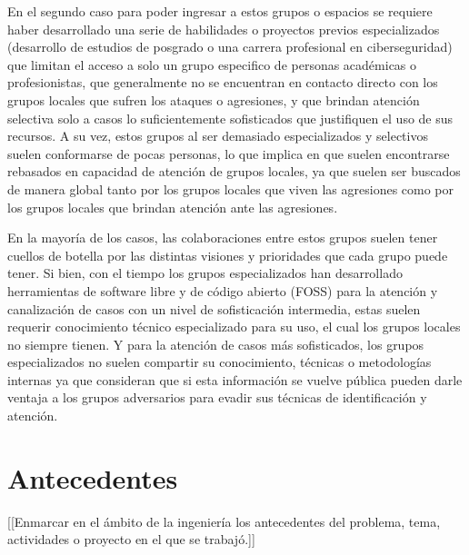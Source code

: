 \documentclass[12pt]{caltech_thesis}
\begin{document}
En el segundo caso para poder ingresar a estos grupos o espacios se requiere haber desarrollado una serie de habilidades o proyectos previos especializados (desarrollo de estudios de posgrado o una carrera profesional en ciberseguridad) que limitan el acceso a solo un grupo especifico de personas académicas o profesionistas, que generalmente no se encuentran en contacto directo con los grupos locales que sufren los ataques o agresiones, y que brindan atención selectiva solo a casos lo suficientemente sofisticados que justifiquen el uso de sus recursos. A su vez, estos grupos al ser demasiado especializados y selectivos suelen conformarse de pocas personas, lo que implica en que suelen encontrarse rebasados en capacidad de atención de grupos locales, ya que suelen ser buscados de manera global tanto por los grupos locales que viven las agresiones como por los grupos locales que brindan atención ante las agresiones.

En la mayoría de los casos, las colaboraciones entre estos grupos suelen tener cuellos de botella  por las distintas visiones y prioridades que cada grupo puede tener. Si bien, con el tiempo los grupos especializados han desarrollado herramientas de software libre  y de código abierto  (FOSS)  para la atención y canalización de casos con un nivel de sofisticación intermedia, estas suelen requerir conocimiento técnico especializado para su uso, el cual los grupos locales no siempre tienen. Y para la atención de casos más sofisticados, los grupos especializados no suelen compartir su conocimiento, técnicas o metodologías internas ya que consideran que si esta información se vuelve pública pueden darle ventaja a los grupos adversarios para evadir sus técnicas de identificación y atención.


\chapter{Antecedentes}

[[Enmarcar en el ámbito de la ingeniería los antecedentes del problema, tema, actividades o proyecto en el que se trabajó.]]
\end{document}
